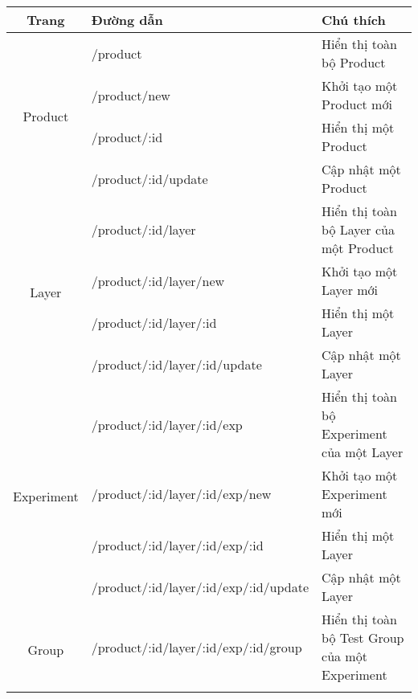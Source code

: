 \begin{table}[h!]
	\centering
	\begin{tabular}{|c|l|p{5cm}|}
		\hline
		Trang                       & Đường dẫn                                       & Chú thích                                      \\ \hline
		\multirow{4}{*}{Product}    & /product                                        & Hiển thị toàn bộ Product                       \\ \cline{2-3}
		                            & /product/new                                    & Khởi tạo một Product mới                       \\ \cline{2-3}
		                            & /product/:id                                    & Hiển thị một Product                           \\ \cline{2-3}
		                            & /product/:id/update                             & Cập nhật một Product                           \\ \hline
		\multirow{4}{*}{Layer}      & /product/:id/layer                              & Hiển thị toàn bộ Layer của một Product         \\ \cline{2-3}
		                            & /product/:id/layer/new                          & Khởi tạo một Layer mới                         \\ \cline{2-3}
		                            & /product/:id/layer/:id                          & Hiển thị một Layer                             \\ \cline{2-3}
		                            & /product/:id/layer/:id/update                   & Cập nhật một Layer                             \\ \hline
		\multirow{4}{*}{Experiment} & /product/:id/layer/:id/exp                      & Hiển thị toàn bộ Experiment của một Layer      \\ \cline{2-3}
		                            & /product/:id/layer/:id/exp/new                  & Khởi tạo một Experiment mới                    \\ \cline{2-3}
		                            & /product/:id/layer/:id/exp/:id                  & Hiển thị một Layer                             \\ \cline{2-3}
		                            & /product/:id/layer/:id/exp/:id/update           & Cập nhật một Layer                             \\ \hline
		\multirow{4}{*}{Group}      & /product/:id/layer/:id/exp/:id/group            & Hiển thị toàn bộ Test Group của một Experiment \\ \cline{2-3}

\end{tabular}
\end{table}
